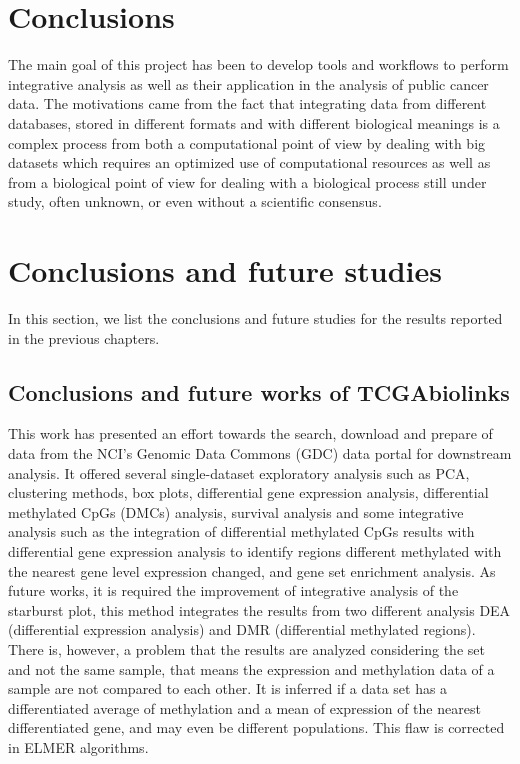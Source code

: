 \section{Conclusions}


The main goal of this project has been to develop tools and workflows to perform integrative analysis as well as their application in the analysis of public cancer data. The motivations came from the fact that integrating data from different databases, stored in different formats and with different biological meanings is a complex process from both a computational point of view by dealing with big datasets which requires an optimized use of computational resources as well as from a biological point of view for dealing with a biological process still under study, often unknown, or even without a scientific consensus.

\section{Conclusions and future studies}

In this section, we list the conclusions and future studies for the results reported in the previous chapters.

\subsection{Conclusions and future works of TCGAbiolinks}

This work has presented an effort towards the search, download and
prepare of data from the NCI's Genomic Data Commons (GDC) data portal for
downstream analysis. It offered several single-dataset
exploratory analysis such as PCA, clustering methods, box plots,
 differential gene expression analysis, differential methylated CpGs (DMCs) analysis,
 survival analysis and some integrative analysis
 such as the integration of differential methylated CpGs results with  differential gene expression analysis
 to identify regions different methylated with the nearest gene level expression changed, and
 gene set enrichment analysis.
As future works, it is required the improvement of integrative analysis of the starburst plot, this method
integrates the results from two different analysis DEA (differential expression analysis) and DMR
(differential methylated regions).
There is, however, a problem that the results are analyzed considering the set and not the same sample,
that means the expression and methylation data of a sample are not compared to each other.
It is inferred if a data set has a differentiated average of methylation and a mean of
expression of the nearest differentiated gene, and may even be different populations.
This flaw is corrected in ELMER algorithms.

